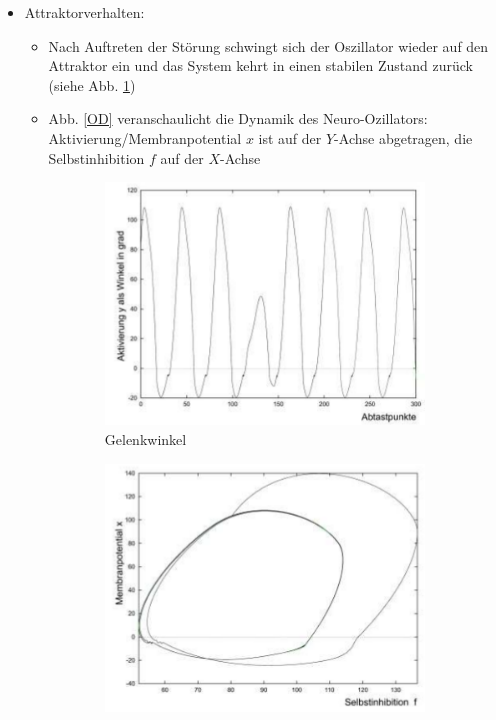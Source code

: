 \begin{itemize}
\item Attraktorverhalten:
\begin{itemize}
\item Nach Auftreten der Störung schwingt sich der Oszillator wieder auf den Attraktor ein und das System kehrt in einen stabilen Zustand zurück (siehe Abb. \ref{GW})
\item Abb. \ref{OD} veranschaulicht die Dynamik des Neuro-Ozillators: Aktivierung/Membranpotential $x$ ist auf der $Y$-Achse abgetragen, die Selbstinhibition $f$ auf der $X$-Achse 
\end{itemize}
\begin{figure}[h!]
	\centering
	\begin{subfigure}{.4\textwidth}
		\includegraphics[width=\textwidth]{figures/ch05_gelenkwinkel.png}
		\caption{Gelenkwinkel}
		\label{GW}
	\end{subfigure}
	\begin{subfigure}{.4\textwidth}
		\includegraphics[width=\textwidth]{figures/ch05_oszillatordynamik.png}

\end{subfigure}
\end{figure}
\end{itemize}
